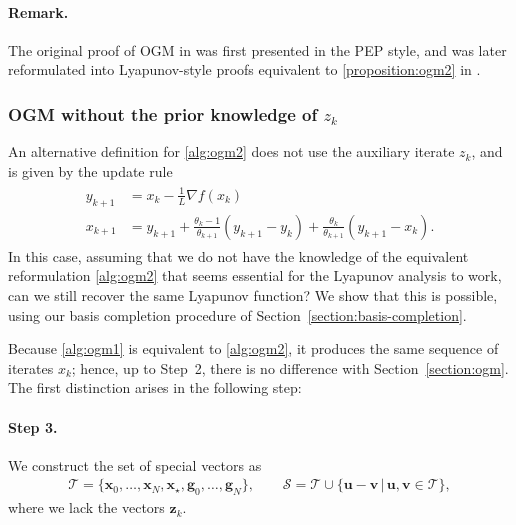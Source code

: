 \documentclass{article}
\theoremstyle{definition}
\theoremstyle{plain}
\newcommand{\vg}{{\mathbf{g}}}
\newcommand{\vu}{{\mathbf{u}}}
\newcommand{\vv}{{\mathbf{v}}}
\newcommand{\vx}{{\mathbf{x}}}
\newcommand{\vz}{{\mathbf{z}}}
\newcommand{\cS}{{\mathcal{S}}}
\newcommand{\cT}{{\mathcal{T}}}
\begin{document}
\paragraph{Remark.}
The original proof of OGM in \citep{KimFessler2016_optimized} was first presented in the PEP style, and was later reformulated into Lyapunov-style proofs equivalent to \cref{proposition:ogm2} in \citep{dAspremontScieurTaylor2021_acceleration,ParkParkRyu2023_factorsqrt2}.

\subsubsection{OGM without the prior knowledge of \texorpdfstring{$z_k$}{zk}}
\label{section:ogm-without-z}

An alternative definition for \ref{alg:ogm2} \citep[OGM1]{KimFessler2016_optimized} does not use the auxiliary iterate $z_k$, and is given by the update rule
\begin{align}
\label{alg:ogm1}
\tag{OGM1}
\begin{aligned}
    y_{k+1} & = x_k - \frac{1}{L} \nabla f(x_k) \\
    x_{k+1} & = y_{k+1} + \frac{\theta_k - 1}{\theta_{k+1}} (y_{k+1} - y_k) + \frac{\theta_k}{\theta_{k+1}} (y_{k+1} - x_k ) .
\end{aligned}
\end{align}
In this case, assuming that we do not have the knowledge of the equivalent reformulation \ref{alg:ogm2} that seems essential for the Lyapunov analysis to work, can we still recover the same Lyapunov function?
We show that this is possible, using our basis completion procedure of Section~\ref{section:basis-completion}.

Because \ref{alg:ogm1} is equivalent to \ref{alg:ogm2}, it produces the same sequence of iterates $x_k$; hence, up to Step~2, there is no difference with Section~\ref{section:ogm}.
The first distinction arises in the following step:

\paragraph{Step 3.} We construct the set of special vectors as
\begin{align*}
    \cT
    =
    \{\vx_0,\dots,\vx_N,\vx_\star,\vg_0,\dots,\vg_N\} ,
    \qquad
    \cS = \cT \cup \{\vu-\vv \,|\, \vu,\vv\in\cT\} ,
\end{align*}
where we lack the vectors $\vz_k$.
\end{document}
